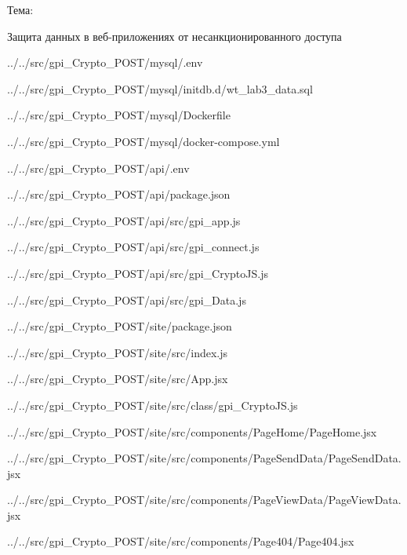 Тема:

Защита данных в веб-приложениях от несанкционированного доступа



{../../src/gpi_Crypto_POST/mysql/.env}


{../../src/gpi_Crypto_POST/mysql/initdb.d/wt_lab3_data.sql}


{../../src/gpi_Crypto_POST/mysql/Dockerfile}


{../../src/gpi_Crypto_POST/mysql/docker-compose.yml}



{../../src/gpi_Crypto_POST/api/.env}


{../../src/gpi_Crypto_POST/api/package.json}


{../../src/gpi_Crypto_POST/api/src/gpi_app.js}


{../../src/gpi_Crypto_POST/api/src/gpi_connect.js}


{../../src/gpi_Crypto_POST/api/src/gpi_CryptoJS.js}


{../../src/gpi_Crypto_POST/api/src/gpi_Data.js}



{../../src/gpi_Crypto_POST/site/package.json}


{../../src/gpi_Crypto_POST/site/src/index.js}


{../../src/gpi_Crypto_POST/site/src/App.jsx}


{../../src/gpi_Crypto_POST/site/src/class/gpi_CryptoJS.js}


{../../src/gpi_Crypto_POST/site/src/components/PageHome/PageHome.jsx}


{../../src/gpi_Crypto_POST/site/src/components/PageSendData/PageSendData.jsx}


{../../src/gpi_Crypto_POST/site/src/components/PageViewData/PageViewData.jsx}


{../../src/gpi_Crypto_POST/site/src/components/Page404/Page404.jsx}
